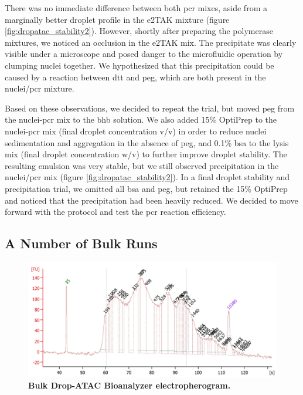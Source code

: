 There was no immediate difference between both \acrshort{pcr} mixes, aside from a marginally better droplet profile in the e2TAK mixture (figure \ref{fig:dropatac_stability2}). However, shortly after preparing the polymerase mixtures, we noticed an occlusion in the e2TAK mix. The precipitate was clearly visible under a microscope and posed danger to the microfluidic operation by clumping nuclei together. We hypothesized that this precipitation could be caused by a reaction between \acrshort{dtt} and \acrshort{peg}, which are both present in the nuclei/\acrshort{pcr} mixture.\pms


Based on these observations, we decided to repeat the trial, but moved \acrshort{peg} from the nuclei-\acrshort{pcr} mix to the \acrshort{bhb} solution. We also added 15\% OptiPrep to the nuclei-\acrshort{pcr} mix (final droplet concentration v/v) in order to reduce nuclei sedimentation and aggregation in the absence of \acrshort{peg}, and 0.1\% \acrshort{bsa} to the lysis mix (final droplet concentration w/v) to further improve droplet stability. The resulting emulsion was very stable, but we still observed precipitation in the nuclei/\acrshort{pcr} mix (figure \ref{fig:dropatac_stability2}). In a final droplet stability and precipitation trial, we omitted all \acrshort{bsa} and \acrshort{peg}, but retained the 15\% OptiPrep and noticed that the precipitation had been heavily reduced. We decided to move forward with the protocol and test the \acrshort{pcr} reaction efficiency.\pms

\subsection{A Number of Bulk Runs}
\begin{figure}
\centering
\includegraphics[width=\textwidth/2]{./ims/dropatac_bulkprofile.png}
\caption[Bulk Drop-ATAC Bioanalyzer electropherogram]{\textbf{Bulk Drop-ATAC Bioanalyzer electropherogram.}}
\label{fig:dropatac_bulkdropatac}
\end{figure}

